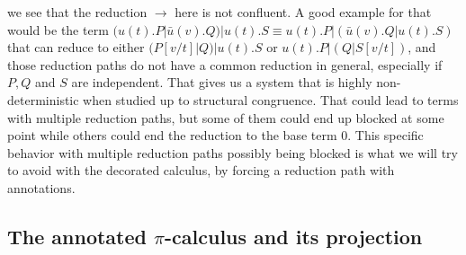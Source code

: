 \remark we see that the reduction $\to$ here is not confluent. A good example for that would be the term $(u(t).P|\bar{u}(v).Q)|u(t).S \equiv u(t).P|(\bar{u}(v).Q|u(t).S)$ that can reduce to either $(P[v/t]|Q)|u(t).S$ or $u(t).P|(Q|S[v/t])$, and those reduction paths do not have a common reduction in general, especially if $P,Q$ and $S$ are independent. That gives us a system that is highly non-deterministic when studied up to structural congruence. That could lead to terms with multiple reduction paths, but some of them could end up blocked at some point while others could end the reduction to the base term 0. This specific behavior with multiple reduction paths possibly being blocked is what we will try to avoid with the decorated calculus, by forcing a reduction path with annotations.

\subsection{The annotated $\pi$-calculus and its projection}

